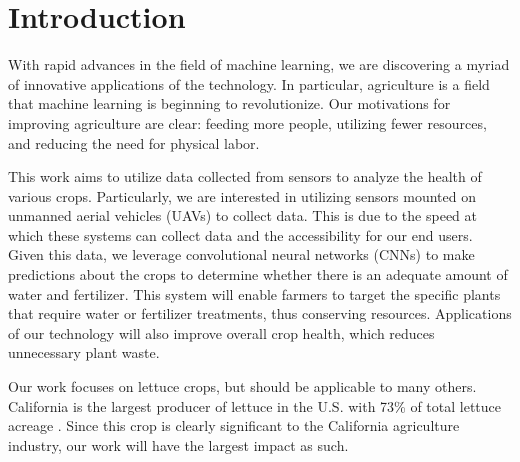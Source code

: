 \chapter{Introduction}
With rapid advances in the field of machine learning, we are discovering a myriad of innovative applications of the technology. In particular, agriculture is a field that machine learning is beginning to revolutionize. Our motivations for improving agriculture are clear: feeding more people, utilizing fewer resources, and reducing the need for physical labor.

This work aims to utilize data collected from sensors to analyze the health of various crops. Particularly, we are interested in utilizing sensors mounted on unmanned aerial vehicles (UAVs) to collect data. This is due to the speed at which these systems can collect data and the accessibility for our end users. Given this data, we leverage convolutional neural networks (CNNs) to make predictions about the crops to determine whether there is an adequate amount of water and fertilizer. This system will enable farmers to target the specific plants that require water or fertilizer treatments, thus conserving resources. Applications of our technology will also improve overall crop health, which reduces unnecessary plant waste.

Our work focuses on lettuce crops, but should be applicable to many others. California is the largest producer of lettuce in the U.S. with 73\% of total lettuce acreage \cite{Lettuce}. Since this crop is clearly significant to the California agriculture industry, our work will have the largest impact as such.